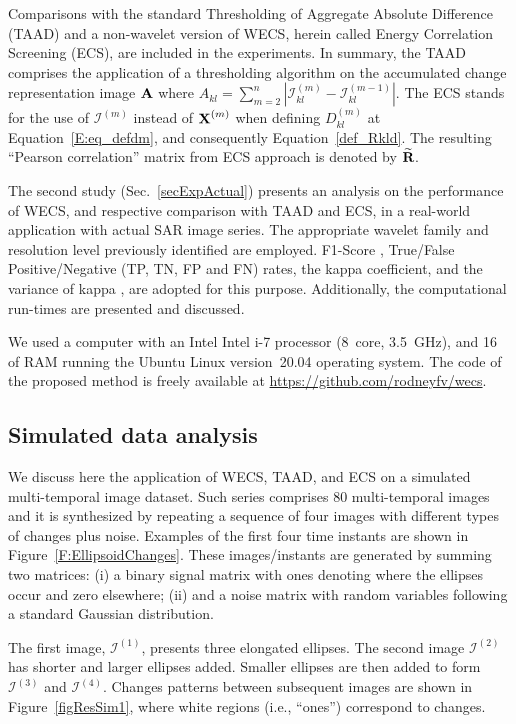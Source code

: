 \documentclass[journal]{IEEEtran}
\newcommand{\vA}{{\textbf A}}
\newcommand{\vR}{{\textbf R}}
\newcommand{\vX}{{\textbf X}}
\begin{document}
Comparisons with the standard Thresholding of Aggregate Absolute Difference (TAAD) and a non-wavelet version of WECS, herein called Energy Correlation Screening (ECS), are included in the experiments. 
In summary, the TAAD comprises the application of a thresholding algorithm on the accumulated change representation image $\vA$ where $A_{kl} = \sum_{m=2}^{n}|\mathcal{I}_{kl}^{(m)}-\mathcal{I}_{kl}^{(m-1)}|$. 
The ECS stands for the use of $\mathcal{I}^{(m)}$ instead of $\vX^{(m)}$ when defining $D_{kl}^{(m)}$ at Equation~\ref{E:eq_defdm}, and consequently Equation~\ref{def_Rkld}. The resulting ``Pearson correlation'' matrix from ECS approach is denoted by $\widetilde{\vR}$.


The second study (Sec.~\ref{secExpActual}) presents an analysis on the performance of WECS, and respective comparison with TAAD and ECS, in a real-world application with actual SAR image series. The appropriate wavelet family and resolution level previously identified are employed. 
F1-Score \cite{Rijsbergen1979}, True/False Positive/Negative (TP, TN, FP and FN) rates, the kappa coefficient, and the variance of kappa \cite{Congalton2019}, are adopted for this purpose. Additionally, the computational run-times are presented and discussed.



We used a computer with an Intel Intel i-7 processor (\SI{8}{core}, \SI{3.5}{\giga\hertz}), and \SI{16}{\giga\byte} of RAM running the Ubuntu Linux version~20.04 operating system.
The code of the proposed method is freely available at \url{https://github.com/rodneyfv/wecs}. 


\subsection{Simulated data analysis}\label{secExpSimulated}

We discuss here the application of  WECS, TAAD, and ECS on a simulated multi-temporal image dataset. 
Such series comprises 80 multi-temporal images and it is synthesized by repeating a sequence of four images with different types of changes plus noise. 
Examples of the first four time instants are shown in Figure~\ref{F:EllipsoidChanges}. 
These images/instants are generated by summing two matrices: (i) a binary signal matrix with ones denoting where the ellipses occur and zero elsewhere; (ii) and a noise matrix with random variables following a standard Gaussian distribution. 

The first image, $\mathcal{I}^{(1)}$, presents three elongated ellipses. The second image $\mathcal{I}^{(2)}$ has shorter and larger ellipses added. Smaller ellipses are then added to form $\mathcal{I}^{(3)}$ and $\mathcal{I}^{(4)}$. Changes patterns between subsequent images are shown in Figure~\ref{figResSim1}, where white regions (i.e., ``ones'') correspond to changes.
\end{document}

